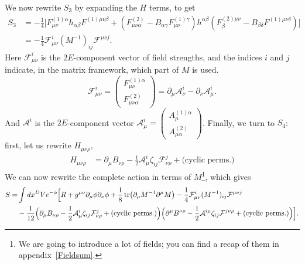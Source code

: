\documentclass{article}
\begin{document}
We now rewrite $S_3$ by expanding the $H$ terms, to get
\begin{equation}
    \begin{aligned}
    S_3 &= -\frac{1}{4}\Big[F^{(1)\alpha}_{\mu \nu }h_{\alpha \beta}F^{(1)\mu \nu \beta}+ (F^{(2)}_{\mu\nu \alpha}-B_{\alpha \gamma}F^{(1)\gamma}_{\mu \nu})h^{\alpha \beta}(F^{(2)\mu \nu}_{\beta}-B_{\beta \delta}F^{(1)\mu \nu \delta})\Big]\\
    &=-\frac{1}{4} \mathcal{F}^i_{\mu \nu}(M^{-1})_{ij} \mathcal{F}^{\mu \nu j}.
    \end{aligned}
\end{equation}
Here $\mathcal{F}^i_{\mu \nu}$ is the $2E$-component vector of field strengths, and the indices $i$ and $j$ indicate, in the matrix framework, which part of $M$ is used.
\begin{equation}
    \mathcal{F}^i_{\mu \nu} = \begin{pmatrix} F^{(1)\alpha}_{\mu \nu} \\F^{(2)}_{\mu \nu \alpha} \end{pmatrix} = \partial_\mu \mathcal{A}^i_\nu - \partial_\nu \mathcal{A}^i_\mu.
\end{equation}
And $\mathcal{A}^i$ is the $2E$-component vector $\mathcal{A}^i_\mu = \begin{pmatrix} A^{(1)\alpha}_{\mu} \\A^{(2)}_{\mu \alpha} \end{pmatrix}$. Finally, we turn to $S_4$: first, let us rewrite $H_{\mu \nu \rho}$,
\begin{equation}
    \begin{aligned}
    H_{\mu \nu \rho} &=\partial_\mu B_{\nu \rho} -\frac{1}{2} \mathcal{A}^i_\mu \zeta_{ij} \mathcal{F}^j_{\nu \rho} + \text{(cyclic perms.)}
      \end{aligned}
\end{equation}
We can now rewrite the complete action in terms of $M$\footnote{We are going to introduce a lot of fields; you can find a recap of them in appendix~\ref{Fieldsum}.}, which gives
\begin{equation}
    \begin{aligned}
    S = &\int dx^D Ve^{-\phi}\Big[R +g^{\mu \nu}\partial_{\mu }\phi \partial_{\nu} \phi + \frac{1}{8}\tr(\partial_\mu M^{-1}\partial^\mu M)
    -\frac{1}{4} \mathcal{F}^i_{\mu \nu}(M^{-1})_{ij} \mathcal{F}^{\mu \nu j}  \\
    &- \frac{1}{12}\Big(\partial_\mu B_{\nu \rho} -\frac{1}{2} \mathcal{A}^i_\mu \zeta_{ij} \mathcal{F}^j_{\nu \rho} + \text{(cyclic perms.)}\Big)\Big(\partial^\mu B^{\nu \rho} -\frac{1}{2} \mathcal{A}^{i\mu} \zeta_{ij} \mathcal{F}^{j\nu \rho} + \text{(cyclic perms.)}\Big)\Big].
    \end{aligned}
\end{equation}
\end{document}
